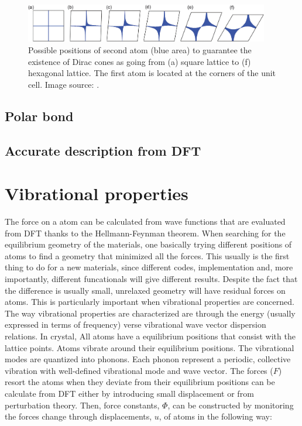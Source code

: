 \begin{figure}[htbp!] 
\centering  
\includegraphics[width=0.95\textwidth]{dirac_hs.png}
\caption{Possible positions of second atom (blue area) to guarantee the existence of Dirac cones as going from (a) square lattice to (f) hexagonal lattice. The first atom is located at the corners of the unit cell. Image source: \cite{Liu2013}. }  
\label{fig:dirac_hs}
\end{figure} 


\subsection{Polar bond}

\subsection{Accurate description from DFT}

\section{Vibrational properties}

The force on a atom can be calculated from wave functions that are evaluated from DFT thanks to the Hellmann-Feynman theorem. When searching for the equilibrium geometry of the materials, one basically trying different positions of atoms to find a geometry that minimized all the forces. This usually is the first thing to do for a new materials, since different codes, implementation and, more importantly, different funcationals will give different results. Despite the fact that the difference is usually small, unrelaxed geometry will have residual forces on atoms. This is particularly important when vibrational properties are concerned. The way vibrational properties are characterized are through the energy (usually expressed in terms of frequency) verse vibrational wave vector dispersion relations.  In crystal,  All atoms have a equilibrium positions that consist with the lattice points. Atoms vibrate around their equilibrium positions. The vibrational modes are quantized into phonons. Each phonon represent a periodic, collective vibration with well-defined vibrational mode and wave vector. The forces ($F$) resort the atoms when they deviate from their equilibrium positions can be calculate from DFT either by introducing small displacement or from perturbation theory. Then, force constants, $\Phi$, can be constructed by monitoring the forces change through displacements, $u$, of atoms in the following way:

